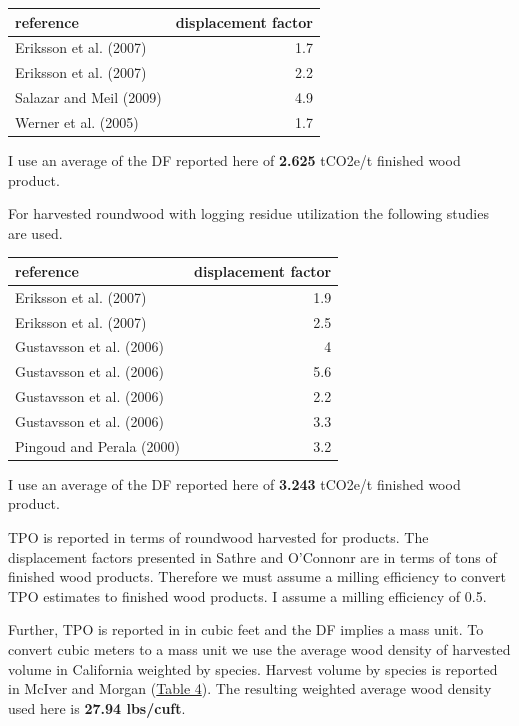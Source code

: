 \documentclass[a4paper]{article}
\begin{document}
\begin{center}
\begin{tabular}{lr}
reference & displacement factor\\
\hline
Eriksson et al. (2007) & 1.7\\
Eriksson et al. (2007) & 2.2\\
Salazar and Meil (2009) & 4.9\\
Werner et al. (2005) & 1.7\\
\end{tabular}

\end{center}

I use an average of the DF reported here of \textbf{2.625} tCO2e/t finished
wood product.

For harvested roundwood with logging residue utilization the following
studies are used.

\begin{center}
\begin{tabular}{lr}
reference & displacement factor\\
\hline
Eriksson et al. (2007) & 1.9\\
Eriksson et al. (2007) & 2.5\\
Gustavsson et al. (2006) & 4\\
Gustavsson et al. (2006) & 5.6\\
Gustavsson et al. (2006) & 2.2\\
Gustavsson et al. (2006) & 3.3\\
Pingoud and Perala (2000) & 3.2\\
\end{tabular}

\end{center}

I use an average of the DF reported here of \textbf{3.243} tCO2e/t finished
wood product.

TPO is reported in terms of roundwood harvested for products. The
displacement factors presented in Sathre and O'Connonr are in terms of
tons of finished wood products. Therefore we must assume a milling
efficiency to convert TPO estimates to finished wood products. I assume
a milling efficiency of 0.5.

Further, TPO is reported in in cubic feet and the DF implies a mass
unit. To convert cubic meters to a mass unit we use the average wood
density of harvested volume in California weighted by species. Harvest
volume by species is reported in McIver and Morgan
(\href{https://docs.google.com/spreadsheets/d/138FWlGeW57MKdcz2UkWxtWV4o50SZO8sduB1R6JOFp8/pubhtml?gid=393414465&single=true}{Table
4}). The resulting weighted average wood density used here is \textbf{27.94
lbs/cuft}.
\end{document}
